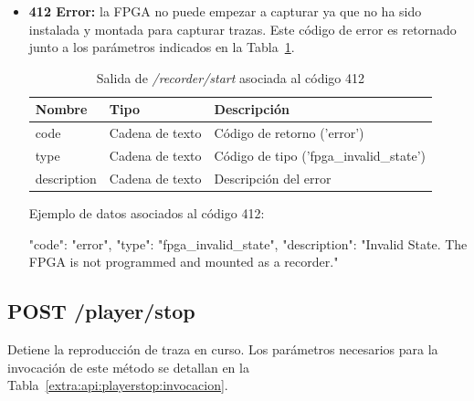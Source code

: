 \begin{itemize}
{\begin{minipage}{\textwidth}
Ejemplo de datos asociados al código 400:

\begin{code}[language=json]
{
  "code": "error",
  "type": "notification",
  "description": "Invalid capture name (must not exist)."
}
\end{code}
\end{minipage}
}

\item{\textbf{412 Error:} la \gls{FPGA} no puede empezar a capturar ya que no ha sido instalada y montada para capturar \glspl{traza}.
Este código de error es retornado junto a los parámetros indicados en la Tabla~\ref{extra:api:recorderstart:error412}.
\begin{table}[H]
\centering
\begin{tabular}{|l|l|l|}
\hline
\rowcolor[HTML]{F5F5F5}
\textbf{Nombre}  & \textbf{Tipo}   & \textbf{Descripción}                    \\ \hline
code             & Cadena de texto & Código de retorno ('error')             \\ \hline
type             & Cadena de texto & Código de tipo ('fpga\_invalid\_state') \\ \hline
description      & Cadena de texto & Descripción del error                   \\ \hline
\end{tabular}
\caption{Salida de \textit{/recorder/start} asociada al código 412}
\label{extra:api:recorderstart:error412}
\end{table}

\begin{minipage}{\textwidth}
Ejemplo de datos asociados al código 412:

\begin{code}[language=json]
{
  "code": "error",
  "type": "fpga_invalid_state",
  "description": "Invalid State. The FPGA is not programmed and mounted as a recorder."
}
\end{code}
\end{minipage}
}

\end{itemize}

%
%
\subsection{POST /player/stop}
Detiene la reproducción de \gls{traza} en curso.
Los parámetros necesarios para la invocación de este método se detallan en la Tabla~\ref{extra:api:playerstop:invocacion}.

